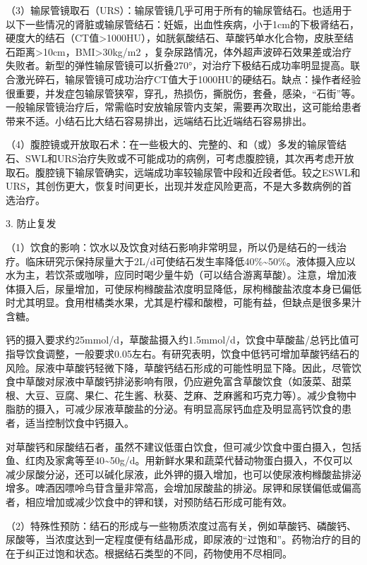 （3）输尿管镜取石（URS）：输尿管镜几乎可用于所有的输尿管结石。也适用于以下一些情况的肾脏或输尿管结石：妊娠，出血性疾病，小于1cm的下极肾结石，硬度大的结石（CT值\textgreater{}1000HU），如胱氨酸结石、草酸钙单水化合物，皮肤至结石距离\textgreater{}10cm，BMI\textgreater{}30kg/m{2}
，复杂尿路情况，体外超声波碎石效果差或治疗失败者。新型的弹性输尿管镜可以折叠270°，对治疗下极结石成功率明显提高。联合激光碎石，输尿管镜可成功治疗CT值大于1000HU的硬结石。缺点：操作者经验很重要，并发症包输尿管狭窄，穿孔，热损伤，撕脱伤，套叠，感染，“石街”等。一般输尿管镜治疗后，常需临时安放输尿管内支架，需要再次取出，这可能给患者带来不适。小结石比大结石容易排出，远端结石比近端结石容易排出。

（4）腹腔镜或开放取石术：在一些极大的、完整的、和（或）多发的输尿管结石、SWL和URS治疗失败或不可能成功的病例，可考虑腹腔镜，其次再考虑开放取石。腹腔镜下输尿管确实，远端成功率较输尿管中段和近段者低。较之ESWL和URS，其创伤更大，恢复时间更长，出现并发症风险更高，不是大多数病例的首选治疗。

3. 防止复发

（1）饮食的影响：饮水以及饮食对结石影响非常明显，所以仍是结石的一线治疗。临床研究示保持尿量大于2L/d可使结石发生率降低40\%\textasciitilde{}50\%。液体摄入应以水为主，若饮茶或咖啡，应同时喝少量牛奶（可以结合游离草酸）。注意，增加液体摄入后，尿量增加，可使尿枸橼酸盐浓度明显降低，尿枸橼酸盐浓度本身已偏低时尤其明显。食用柑橘类水果，尤其是柠檬和酸橙，可能有益，但缺点是很多果汁含糖。

钙的摄入要求约25mmol/d，草酸盐摄入约1.5mmol/d，饮食中草酸盐/总钙比值可指导饮食调整，一般要求0.05左右。有研究表明，饮食中低钙可增加草酸钙结石的风险。尿液中草酸钙轻微下降，草酸钙结石形成的可能性明显下降。因此，尽管饮食中草酸对尿液中草酸钙排泌影响有限，仍应避免富含草酸饮食（如菠菜、甜菜根、大豆、豆腐、果仁、花生酱、秋葵、芝麻、芝麻酱和巧克力等）。减少食物中脂肪的摄入，可减少尿液草酸盐的分泌。有明显高尿钙血症及明显高钙饮食的患者，适当控制饮食中钙摄入。

对草酸钙和尿酸结石者，虽然不建议低蛋白饮食，但可减少饮食中蛋白摄入，包括鱼、红肉及家禽等至40\textasciitilde{}50g/d。用新鲜水果和蔬菜代替动物蛋白摄入，不仅可以减少尿酸分泌，还可以碱化尿液，此外钾的摄入增加，也可以使尿液枸橼酸盐排泌增多。啤酒因嘌呤鸟苷含量非常高，会增加尿酸盐的排泌。尿钾和尿镁偏低或偏高者，相应增加或减少饮食中的钾和镁，对预防结石形成可能有效。

（2）特殊性预防：结石的形成与一些物质浓度过高有关，例如草酸钙、磷酸钙、尿酸等，当浓度达到一定程度便有结晶形成，即尿液的“过饱和”。药物治疗的目的在于纠正过饱和状态。根据结石类型的不同，药物使用不尽相同。

